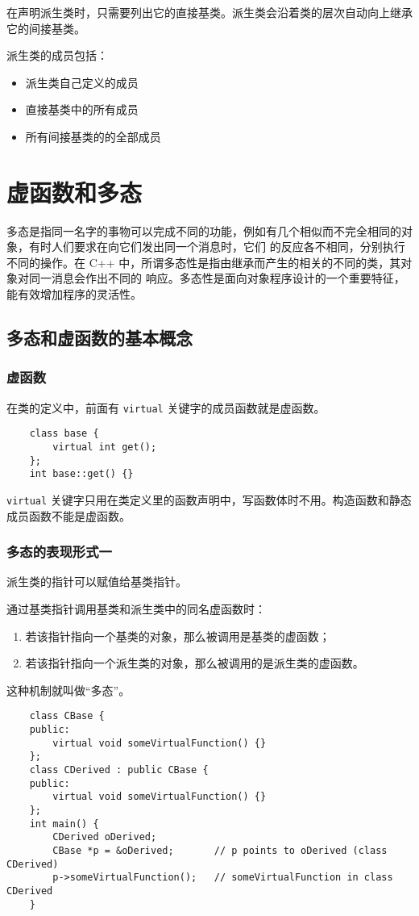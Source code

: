 \documentclass[UTF8]{ctexart}
\begin{document}
在声明派生类时，只需要列出它的直接基类。派生类会沿着类的层次自动向上继承它的间接基类。

派生类的成员包括：
\begin{itemize}
    \item 派生类自己定义的成员
    \item 直接基类中的所有成员
    \item 所有间接基类的的全部成员
\end{itemize}

\section{虚函数和多态}
多态是指同一名字的事物可以完成不同的功能，例如有几个相似而不完全相同的对象，有时人们要求在向它们发出同一个消息时，它们
的反应各不相同，分别执行不同的操作。在 C++ 中，所谓多态性是指由继承而产生的相关的不同的类，其对象对同一消息会作出不同的
响应。多态性是面向对象程序设计的一个重要特征，能有效增加程序的灵活性。
\subsection{多态和虚函数的基本概念}
\subsubsection{虚函数}
在类的定义中，前面有 \texttt{virtual} 关键字的成员函数就是虚函数。
\begin{verbatim}
    class base {
        virtual int get();
    };
    int base::get() {}
\end{verbatim}

\texttt{virtual} 关键字只用在类定义里的函数声明中，写函数体时不用。构造函数和静态成员函数不能是虚函数。

\subsubsection{多态的表现形式一}
派生类的指针可以赋值给基类指针。

通过基类指针调用基类和派生类中的同名虚函数时：
\begin{enumerate}
    \item 若该指针指向一个基类的对象，那么被调用是基类的虚函数；
    \item 若该指针指向一个派生类的对象，那么被调用的是派生类的虚函数。
\end{enumerate}

这种机制就叫做“多态”。

\begin{verbatim}
    class CBase {
    public:
        virtual void someVirtualFunction() {}
    };
    class CDerived : public CBase {
    public:
        virtual void someVirtualFunction() {}
    };
    int main() {
        CDerived oDerived;
        CBase *p = &oDerived;       // p points to oDerived (class CDerived)
        p->someVirtualFunction();   // someVirtualFunction in class CDerived
    }
\end{verbatim}
\end{document}
